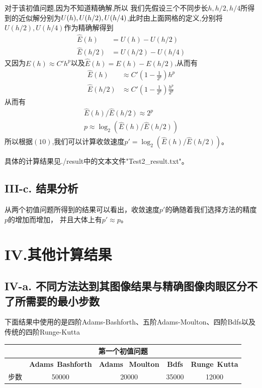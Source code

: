 \documentclass[twoside,a4paper]{article}
\begin{document}
对于该初值问题,因为不知道精确解,所以
我们先假设三个不同步长$h,h/2,h/4$所得到的近似解分别为$U(h),U(h/2),\\[2pt]U(h/4)$,此时由上面网格的定义,分别将$U(h/2),U(h/4)$作为精确解得到
    \begin{align}
        \hat{E}(h)   & =U(h)-U(h/2)   \\
        \hat{E}(h/2) & =U(h/2)-U(h/4)
    \end{align}
    又因为$E(h)\approx C'h^p$以及$\hat{E}(h)=E(h)-E(h/2)$,从而有
    \begin{align}
        \hat{E}(h)   & \approx C'(1-\frac{1}{2^p})h^p             \\
        \hat{E}(h/2) & \approx C'(1-\frac{1}{2^p})\frac{h^p}{2^p}
    \end{align}
    从而有
    \begin{align}
        \hat{E}(h)/\hat{E}(h/2)  \approx 2^p \\
        p                        \approx \log_2(\hat{E}(h)/\hat{E}(h/2))
    \end{align}
    所以根据$(10)$,我们可以计算收敛速度$p'=\log_2(\hat{E}(h)/\hat{E}(h/2))$。

    具体的计算结果见./result中的文本文件"Test2\_result.txt"。

    \subsection*{III-c. 结果分析}
    \hspace{0.8em}
    从两个初值问题所得到的结果可以看出，收敛速度$p'$的确随着我们选择方法的精度$p$的增加而增加，
    并且大体上有$p'\approx p$。


\newpage
\section*{IV.其他计算结果}
\subsection*{IV-a. 不同方法达到其图像结果与精确图像肉眼区分不了所需要的最小步数}
\hspace{0.8em}
下面结果中使用的是四阶Adams-Bashforth、五阶Adams-Moulton、四阶Bdfs以及传统的四阶Runge-Kutta
\\[5pt]
\centering
\renewcommand{\arraystretch}{1.5}
\begin{tabular}{|c|c|c|c|c|}
    \multicolumn{5}{c}{\textbf{第一个初值问题}}                                                                                    \\
    \hline
         & \textbf{Adams}\ \textbf{Bashforth} & \textbf{Adams} \ \textbf{Moulton} & \textbf{Bdfs} & \textbf{Runge}\ \textbf{Kutta} \\
    \hline
    步数 & 50000                              & 20000                             & 35000         & 12000                          \\
    \hline
\end{tabular}
\end{document}
